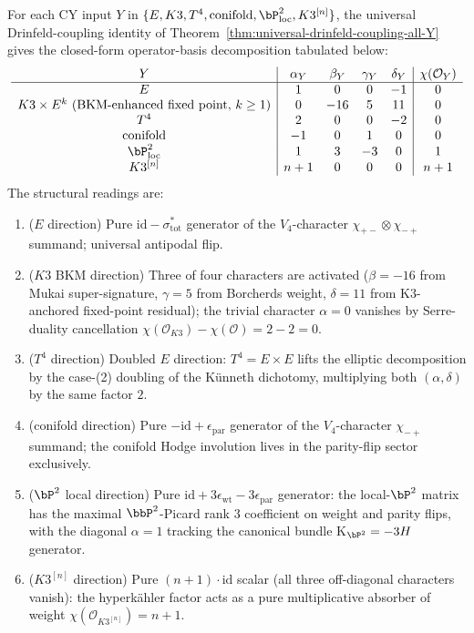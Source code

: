 \begin{corollary}
\label{cor:cy-direction-character-table}
For each CY input $Y$ in $\{E, K3, T^4, \mathrm{conifold}, \bP^2_{\mathrm{loc}},
K3^{[n]}\}$, the universal Drinfeld-coupling identity of
Theorem~\ref{thm:universal-drinfeld-coupling-all-Y} gives the closed-form
operator-basis decomposition tabulated below:
\[
\begin{array}{c|cccc|c}
Y & \alpha_Y & \beta_Y & \gamma_Y & \delta_Y & \chi(\mathcal{O}_Y) \\ \hline
E & 1 & 0 & 0 & -1 & 0 \\
K3 \times E^k \text{ (BKM-enhanced fixed point, }k \geq 1\text{)} & 0 & -16 & 5 & 11 & 0 \\
T^4 & 2 & 0 & 0 & -2 & 0 \\
\mathrm{conifold} & -1 & 0 & 1 & 0 & 0 \\
\bP^2_{\mathrm{loc}} & 1 & 3 & -3 & 0 & 1 \\
K3^{[n]} & n+1 & 0 & 0 & 0 & n+1
\end{array}
\]
The structural readings are:
\begin{enumerate}[label=\textup{(\arabic*)}]
 \item \textup{($E$ direction)} Pure $\mathrm{id} - \sigma_{\mathrm{tot}}^*$
 generator of the $V_4$-character $\chi_{+-} \otimes \chi_{-+}$ summand;
 universal antipodal flip.
 \item \textup{($K3$ BKM direction)} Three of four characters are activated
 \textup{(}$\beta = -16$ from Mukai super-signature, $\gamma = 5$ from
 Borcherds weight, $\delta = 11$ from K$3$-anchored fixed-point
 residual\textup{);} the trivial character $\alpha = 0$ vanishes by
 Serre-duality cancellation $\chi(\mathcal{O}_{K3}) - \chi(\mathcal{O})
 = 2 - 2 = 0$.
 \item \textup{($T^4$ direction)} Doubled $E$ direction: $T^4 = E \times E$
 lifts the elliptic decomposition by the case-(2) doubling of the
 Künneth dichotomy, multiplying both $(\alpha, \delta)$ by the same
 factor $2$.
 \item \textup{(conifold direction)} Pure $-\mathrm{id} + \epsilon_{\mathrm{par}}$
 generator of the $V_4$-character $\chi_{-+}$ summand; the conifold
 Hodge involution lives in the parity-flip sector exclusively.
 \item \textup{($\bP^2$ local direction)} Pure $\mathrm{id} +
 3 \epsilon_{\mathrm{wt}} - 3 \epsilon_{\mathrm{par}}$ generator: the
 local-$\bP^2$ matrix has the maximal $\bbP^2$-Picard rank $3$
 coefficient on weight and parity flips, with the diagonal $\alpha =
 1$ tracking the canonical bundle K$_{\bP^2} = -3 H$ generator.
 \item \textup{($K3^{[n]}$ direction)} Pure $(n+1) \cdot \mathrm{id}$ scalar
 \textup{(}all three off-diagonal characters vanish\textup{):} the
 hyperk\"ahler factor acts as a pure multiplicative absorber of weight
 $\chi(\mathcal{O}_{K3^{[n]}}) = n + 1$.
\end{enumerate}
\end{corollary}

